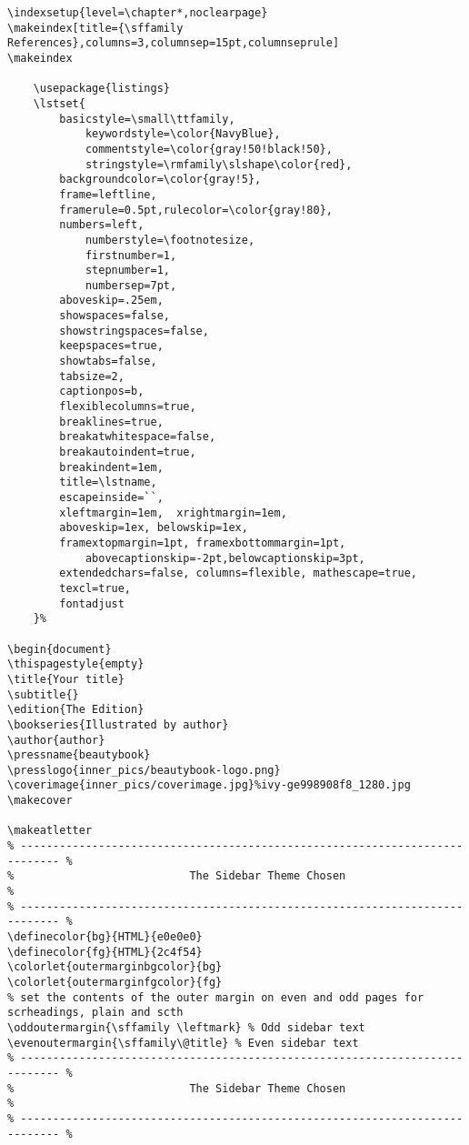 \documentclass[lang=en,12pt]{beautybook}
\begin{document}
\begin{lstlisting}
\indexsetup{level=\chapter*,noclearpage}
\makeindex[title={\sffamily References},columns=3,columnsep=15pt,columnseprule]
\makeindex

    \usepackage{listings}
    \lstset{
        basicstyle=\small\ttfamily,	
            keywordstyle=\color{NavyBlue}, 
            commentstyle=\color{gray!50!black!50},   	
            stringstyle=\rmfamily\slshape\color{red}, 	
        backgroundcolor=\color{gray!5},     
        frame=leftline,						
        framerule=0.5pt,rulecolor=\color{gray!80}, 
        numbers=left,				
            numberstyle=\footnotesize,	
            firstnumber=1,
            stepnumber=1,                  	
            numbersep=7pt,               	
        aboveskip=.25em, 			
        showspaces=false,               	
        showstringspaces=false,        
        keepspaces=true, 					
        showtabs=false,                 	
        tabsize=2,                     		
        captionpos=b,                   	
        flexiblecolumns=true, 			
        breaklines=true,                	
        breakatwhitespace=false,        	
        breakautoindent=true,			
        breakindent=1em, 			
        title=\lstname,				
        escapeinside=``,  		
        xleftmargin=1em,  xrightmargin=1em,     
        aboveskip=1ex, belowskip=1ex,
        framextopmargin=1pt, framexbottommargin=1pt,
            abovecaptionskip=-2pt,belowcaptionskip=3pt,
        extendedchars=false, columns=flexible, mathescape=true,
        texcl=true,
        fontadjust
    }%

\begin{document}
\thispagestyle{empty}
\title{Your title}
\subtitle{}
\edition{The Edition}
\bookseries{Illustrated by author}
\author{author}
\pressname{beautybook}
\presslogo{inner_pics/beautybook-logo.png}
\coverimage{inner_pics/coverimage.jpg}%ivy-ge998908f8_1280.jpg
\makecover

\makeatletter
% ---------------------------------------------------------------------------- %
%                           The Sidebar Theme Chosen                           %
% ---------------------------------------------------------------------------- %
\definecolor{bg}{HTML}{e0e0e0}
\definecolor{fg}{HTML}{2c4f54}
\colorlet{outermarginbgcolor}{bg}
\colorlet{outermarginfgcolor}{fg}
% set the contents of the outer margin on even and odd pages for scrheadings, plain and scth
\oddoutermargin{\sffamily \leftmark} % Odd sidebar text
\evenoutermargin{\sffamily\@title} % Even sidebar text
% ---------------------------------------------------------------------------- %
%                           The Sidebar Theme Chosen                           %
% ---------------------------------------------------------------------------- %


\end{lstlisting}
\end{document}
